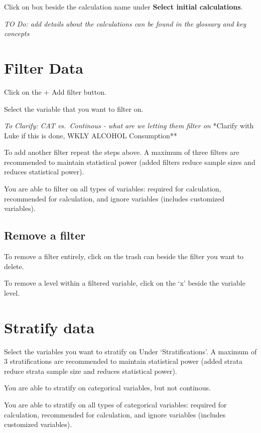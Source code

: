 \documentclass[]{book}
\begin{document}
Click on box beside the calculation name under \textbf{Select initial
calculations}.

\emph{TO Do: add details about the calculations can be found in the
glossary and key concepts}

\section{Filter Data}\label{filter-data}

Click on the + Add filter button.

Select the variable that you want to filter on.

\emph{To Clarify: CAT vs.~Continous - what are we letting them filter
on} *Clarify with Luke if this is done, WKLY ALCOHOL Consumption**

To add another filter repeat the steps above. A maximum of three filters
are recommended to maintain statistical power (added filters reduce
sample sizes and reduces statistical power).

You are able to filter on all types of variables: required for
calculation, recommended for calculation, and ignore variables (includes
customized variables).

\subsection{Remove a filter}\label{remove-a-filter}

To remove a filter entirely, click on the trash can beside the filter
you want to delete.

To remove a level within a filtered variable, click on the `x' beside
the variable level.

\section{Stratify data}\label{stratify-data}

Select the variables you want to stratify on Under `Stratifications'. A
maximum of 3 stratifications are recommended to maintain statistical
power (added strata reduce strata sample size and reduces statistical
power).

You are able to stratify on categorical variables, but not continous.

You are able to stratify on all types of categorical variables: required
for calculation, recommended for calculation, and ignore variables
(includes customized variables).
\end{document}
